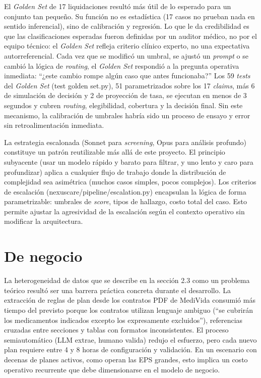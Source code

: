 El \textit{Golden Set} de 17 liquidaciones resultó más útil de lo esperado para un conjunto tan pequeño. Su función no es estadística (17 casos no prueban nada en sentido inferencial), sino de calibración y regresión. Lo que le da credibilidad es que las clasificaciones esperadas fueron definidas por un auditor médico, no por el equipo técnico: el \textit{Golden Set} refleja criterio clínico experto, no una expectativa autorreferencial. Cada vez que se modificó un umbral, se ajustó un \textit{prompt} o se cambió la lógica de \textit{routing}, el \textit{Golden Set} respondió a la pregunta operativa inmediata: “¿este cambio rompe algún caso que antes funcionaba?” Los 59 \textit{tests} del \textit{Golden Set}   (test golden set.py), 51 parametrizados sobre los 17 \textit{claims}, más 6 de simulación de decisión y 2 de proyección de tasa, se ejecutan en menos de 3 segundos y cubren \textit{routing}, elegibilidad, cobertura y la decisión final. Sin este mecanismo, la calibración de umbrales habría sido un proceso de ensayo y error sin retroalimentación inmediata.

La estrategia escalonada (Sonnet para \textit{screening}, Opus para análisis profundo) constituye un patrón reutilizable más allá de este proyecto. El principio subyacente (usar un modelo rápido y barato para filtrar, y uno lento y caro para profundizar) aplica a cualquier flujo de trabajo donde la distribución de complejidad sea asimétrica (muchos casos simples, pocos complejos). Los criterios de escalación (nexuscare/pipeline/escalation.py) encapsulan la lógica de forma parametrizable: umbrales de \textit{score}, tipos de hallazgo, costo total del caso. Esto permite ajustar la agresividad de la escalación según el contexto operativo sin modificar la arquitectura.

\section{De negocio}

La heterogeneidad de datos que se describe en la sección 2.3 como un problema teórico resultó ser una barrera práctica concreta durante el desarrollo. La extracción de reglas de plan desde los contratos PDF de MediVida consumió más tiempo del previsto porque los contratos utilizan lenguaje ambiguo (“se cubrirán los medicamentos indicados excepto los expresamente excluidos”), referencias cruzadas entre secciones y tablas con formatos inconsistentes. El proceso semiautomático (LLM extrae, humano valida) redujo el esfuerzo, pero cada nuevo plan requiere entre 4 y 8 horas de configuración y validación. En un escenario con decenas de planes activos, como operan las EPS grandes, esto implica un costo operativo recurrente que debe dimensionarse en el modelo de negocio.

